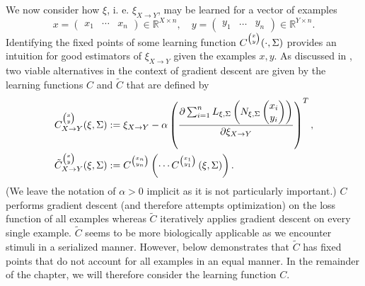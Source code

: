 \documentclass[a4paper,11pt]{report}
\begin{document}
\begin{Par}\label{discus-learning}
We now consider how $\xi$, i. e. $\xi_{X\to Y}$, may be learned for a vector of examples
\[
x=\begin{pmatrix}
x_1&\dotsb&x_n
\end{pmatrix}
\in\mathbb{R}^{X\times n},\quad
y=\begin{pmatrix}
y_1&\dotsc &y_n
\end{pmatrix}
\in\mathbb{R}^{Y\times n}.
\]
Identifying the fixed points of some learning function $C^{\tiny\begin{pmatrix}
x\\y
\end{pmatrix}}(\cdot,\Sigma)$
provides an intuition for good estimators of $\xi_{X\to Y}$ given the examples $x,y$. As discussed in , two viable alternatives in the context of gradient descent are given by the learning functions $C$ and $\tilde{C}$ that are defined by
\begin{align*}
C_{X\to Y}^{\tiny\begin{pmatrix}
x\\y
\end{pmatrix}}(\xi,\Sigma)&:=
\xi_{X\to Y}-\alpha\left(\frac{\partial\sum_{i=1}^nL_{\xi,\Sigma}\left(N_{\xi,\Sigma}\begin{pmatrix}
x_i\\y_i
\end{pmatrix}\right)}{\partial\xi_{X\to Y}}\right)^T,\\
\tilde{C}_{X\to Y}^{\tiny\begin{pmatrix}
x\\y
\end{pmatrix}}(\xi,\Sigma)&:=
C^{\tiny\begin{pmatrix}
x_n\\y_n
\end{pmatrix}}\left(\dotsb
C^{\tiny\begin{pmatrix}
x_1\\y_1
\end{pmatrix}}\left(\xi,\Sigma\right)\right).
\end{align*}
(We leave the notation of $\alpha>0$ implicit as it is not particularly important.) $C$ performs gradient descent (and therefore attempts optimization) on the loss function of all examples whereas $\tilde{C}$ iteratively applies gradient descent on every single example. $\tilde{C}$ seems to be more biologically applicable as we encounter stimuli in a serialized manner. However,  below demonstrates that $\tilde{C}$ has fixed points that do not account for all examples in an equal manner. In the remainder of the chapter, we will therefore consider the learning function $C$.
\end{Par}
\end{document}
